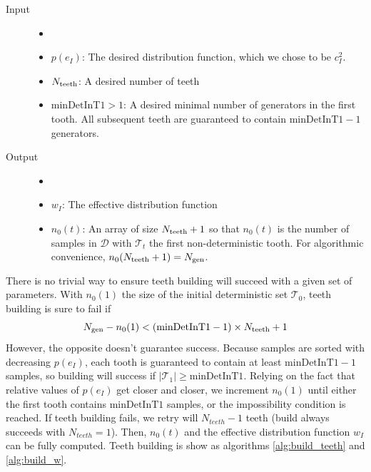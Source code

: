 \documentclass[./thesis.tex]{subfiles}
\newcommand{\minDetInT}{\text{minDetInT1}}
\begin{document}
\begin{description}

\item[Input] 
\begin{itemize}
\item[] \phantom{pouet}
\item $p(e_I)$:
The desired distribution function, which we chose to be $c_I^2$.
\item $N_\text{teeth}$:
A desired number of teeth
\item $\minDetInT > 1$:
A desired minimal number of generators in the first tooth. All subsequent teeth are guaranteed to contain $\minDetInT-1$ generators.
\end{itemize}

\item[Output] 
\begin{itemize}
\item[] \phantom{pouet}
\item $w_I$:
The effective distribution function
\item $n_0(t)$:
An array of size $N_\text{teeth}+1$ so that $n_0(t)$ is the number of samples in $\mathcal{D}$ with $\mathcal{T}_t$ the first non-deterministic tooth. For algorithmic convenience, $n_0(N_\text{teeth}+1)={N_\text{gen}}$.
\end{itemize}
\end{description}


There is no trivial way to ensure teeth building will succeed with a given set of parameters. 
With $n_0(1)$ the size of the initial deterministic set $\mathcal{T}_0$, teeth building is sure to fail if 
\begin{equation}
\Ngen - n_0(1) < (\minDetInT - 1) \times \Nteeth + 1
\end{equation}
However, the opposite doesn't guarantee success. Because samples are sorted with decreasing $p(e_I)$, each tooth is guaranteed to contain at least $\minDetInT -1$ samples, so building will success if $|\mathcal{T}_1| \geq \minDetInT$.
Relying on the fact that relative values of $p(e_I)$ get closer and closer, we increment $n_0(1)$ until either the first tooth contains $\minDetInT$ samples, or the impossibility condition is reached.
If teeth building fails, we retry will $N_{teeth} - 1$ teeth (build always succeeds with $N_{teeth} = 1$).
Then, $n_0(t)$ and the effective distribution function $w_I$ can be fully computed.
Teeth building is show as algorithms \ref{alg:build_teeth} and \ref{alg:build_w}.
\end{document}
